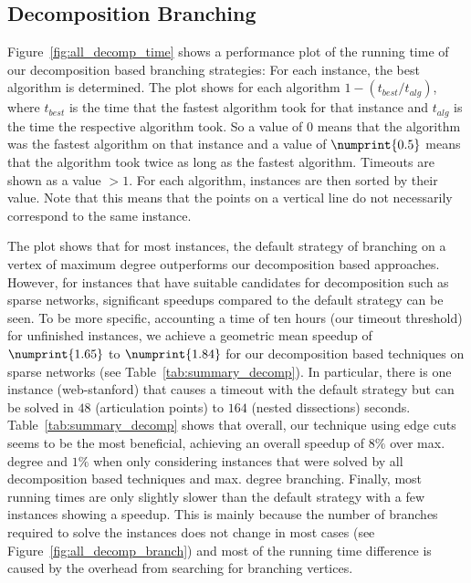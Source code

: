 \documentclass[a4paper,UKenglish,cleveref, autoref, thm-restate]{lipics-v2021}
\begin{document}
\subsection{Decomposition Branching}
\label{sec:experiments_decomp}

Figure~\ref{fig:all_decomp_time} shows a performance plot of the running time of
our decomposition based branching strategies: For each instance, the best
algorithm is determined. The plot shows for each algorithm $1 - (t_{best}/
t_{alg})$, where $t_{best}$ is the time that the fastest algorithm took
for that instance and $t_{alg}$ is the time the respective algorithm took.
So a value of $0$ means that
the algorithm was the fastest algorithm on that instance and a value of
$\numprint{0.5}$ means that the algorithm took twice as long as the fastest
algorithm. Timeouts are shown as a value $> 1$. For each algorithm, instances
are then sorted by their value. Note that this means that the points on a
vertical line do not necessarily correspond to the same instance.

The plot shows that for most instances, the default strategy of branching on a
vertex of maximum degree outperforms our decomposition based approaches.
However, for instances that have suitable candidates for decomposition such as
sparse networks, significant speedups compared to the default strategy can be
seen. To be more specific, accounting a time of ten hours (our timeout threshold) for unfinished
instances, we achieve a geometric
mean speedup of $\numprint{1.65}$ to $\numprint{1.84}$ for our
decomposition based techniques on sparse networks (see
Table~\ref{tab:summary_decomp}). In particular, there is one instance (web-stanford) that causes a timeout with the
default strategy but can be solved in $48$ (articulation points) to $164$ (nested
dissections) seconds. Table~\ref{tab:summary_decomp} shows that overall, our
technique using edge cuts seems to be the most beneficial, achieving an overall speedup of $8\%$ over max. degree and $1\%$
when only considering instances that were solved by all decomposition based
techniques and max. degree branching.
Finally, most running
times are only slightly slower than the default strategy with a few instances
showing a speedup. This is mainly because
the number of branches required to solve the instances does not change in most
cases (see Figure~\ref{fig:all_decomp_branch}) and most of the running time
difference is caused by the overhead from
searching for branching vertices.
\end{document}
